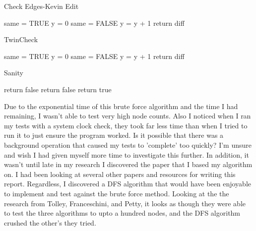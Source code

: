 \documentclass[notitlepage]{report}
\begin{document}
\begin{algorithm}
\caption{Check Edges-Kevin Edit}
\begin{algorithmic}[1]

    \State same = TRUE
        \State y = 0
        	\State same = FALSE
        \EndIf
        \State y = y + 1
        \EndWhile
    \EndFor
    \State return diff
\label{CheckEdge2}
\EndProcedure

\end{algorithmic}
\end{algorithm}



\begin{algorithm}
\caption{TwinCheck}
\begin{algorithmic}[1]

    \State same = TRUE
        \State y = 0
        	\State same = FALSE
        \EndIf
        \State y = y + 1
        \EndWhile
    \EndFor
    \State return diff
\label{CheckEdge3}
\EndProcedure

\end{algorithmic}
\end{algorithm}

\begin{algorithm}
\caption{Sanity}
\begin{algorithmic}[1]

    	\State return false
    	\State return false
    \Else
    	\State return true
    \EndIf
\label{SanityCheck1}
\EndProcedure

\end{algorithmic}
\end{algorithm}
\newpage

Due to the exponential time of this brute force algorithm and the time I had remaining, I wasn't able to test very high node counts. Also I noticed when I ran my tests with a system clock check, they took far less time than when I tried to run it to just ensure the program worked. Is it possible that there was a background operation that caused my tests to 'complete' too quickly? I'm unsure and wish I had given myself more time to investigate this further. In  addition, it wasn't until late in my research I discovered the paper that I based my algorithm on. I had been looking at several other papers and resources for writing this report. Regardless, I discovered a DFS algorithm that would have been enjoyable to implement and test against the brute force method. Looking at the the research from Tolley, Franceschini, and Petty, it looks as though they were able to test the three algorithms to upto a hundred nodes, and the DFS algorithm crushed the other's they tried.~\cite{tolley}
\end{document}
